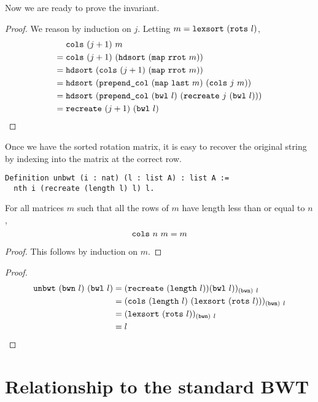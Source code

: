 \documentclass[sigplan,10pt,anonymous,review]{thesis}
\begin{document}
Now we are ready to prove the invariant.
\recreatecorrectinv
\begin{proof}
  We reason by induction on $j$. Letting $m =
  \texttt{\textup{lexsort}}~(\texttt{\textup{rots}}~l)$,
  \begin{align*}
    &\texttt{\textup{cols}}~(j+1)~m \\
    ={}& \texttt{\textup{cols}}~(j+1)~(\texttt{\textup{hdsort}}~(\texttt{\textup{map}}~\texttt{\textup{rrot}}~m)) \\
    ={}&
    \texttt{\textup{hdsort}}~(\texttt{\textup{cols}}~(j+1)~(\texttt{\textup{map}}~\texttt{\textup{rrot}}~m)) \\
    ={}&
    \texttt{\textup{hdsort}}~(\texttt{\textup{prepend\_col}}~(\texttt{\textup{map}}~\texttt{\textup{last}}~m)~(\texttt{\textup{cols}}~j~m)) \\
    ={}&
    \texttt{\textup{hdsort}}~(\texttt{\textup{prepend\_col}}~(\texttt{\textup{bwl}}~l)~(\texttt{\textup{recreate}}~j~(\texttt{\textup{bwl}}~l))) \\
    ={}& \texttt{\textup{recreate}}~(j + 1)~(\texttt{\textup{bwl}}~l) \qedhere
  \end{align*}
\end{proof}

Once we have the sorted rotation matrix, it is easy to recover the
original string by indexing into the matrix at the correct row.
\begin{lstlisting}
Definition unbwt (i : nat) (l : list A) : list A :=
  nth i (recreate (length l) l) l.
\end{lstlisting}

\begin{theorem}[cols\_id]
  For all matrices $m$ such that all the rows of $m$ have length less
  than or equal to $n$,
  \begin{equation*}
    \texttt{\textup{cols}}~n~m = m
  \end{equation*}
\end{theorem}
\begin{proof}
  This follows by induction on $m$.
\end{proof}

\unbwtcorrect
\begin{proof}
\begin{align*}
     \texttt{\textup{unbwt}}~(\texttt{\textup{bwn}}~l)~(\texttt{\textup{bwl}}~l)
  &= (\texttt{\textup{recreate}}~(\texttt{\textup{length}}~l))(\texttt{\textup{bwl}}~l))_{(\texttt{\textup{bwn}})~l}\\
  &= (\texttt{\textup{cols}}~(\texttt{\textup{length}}~l)~(\texttt{\textup{lexsort}}~(\texttt{\textup{rots}}~l)))_{(\texttt{\textup{bwn}})~l} \\
  &= (\texttt{\textup{lexsort}}~(\texttt{\textup{rots}}~l))_{(\texttt{\textup{bwn}})~l} \\
  &= l \qedhere
\end{align*}
\end{proof}

\section{Relationship to the standard BWT}
\label{sec:opt}
\end{document}
